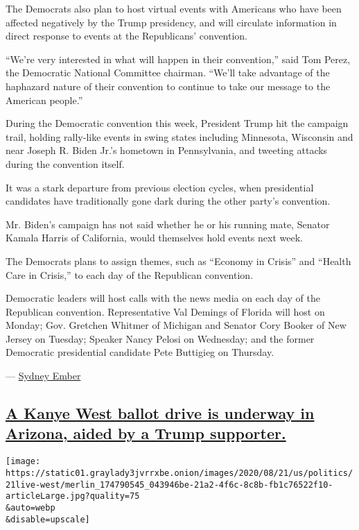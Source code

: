 The Democrats also plan to host virtual events with Americans who have
been affected negatively by the Trump presidency, and will circulate
information in direct response to events at the Republicans' convention.

``We're very interested in what will happen in their convention,'' said
Tom Perez, the Democratic National Committee chairman. ``We'll take
advantage of the haphazard nature of their convention to continue to
take our message to the American people.''

During the Democratic convention this week, President Trump hit the
campaign trail, holding rally-like events in swing states including
Minnesota, Wisconsin and near Joseph R. Biden Jr.'s hometown in
Pennsylvania, and tweeting attacks during the convention itself.

It was a stark departure from previous election cycles, when
presidential candidates have traditionally gone dark during the other
party's convention.

Mr. Biden's campaign has not said whether he or his running mate,
Senator Kamala Harris of California, would themselves hold events next
week.

The Democrats plans to assign themes, such as ``Economy in Crisis'' and
``Health Care in Crisis,'' to each day of the Republican convention.

Democratic leaders will host calls with the news media on each day of
the Republican convention. Representative Val Demings of Florida will
host on Monday; Gov. Gretchen Whitmer of Michigan and Senator Cory
Booker of New Jersey on Tuesday; Speaker Nancy Pelosi on Wednesday; and
the former Democratic presidential candidate Pete Buttigieg on Thursday.

--- \href{https://www.nytimes3xbfgragh.onion/by/sydney-ember}{Sydney
Ember}

\hypertarget{a-kanye-west-ballot-drive-is-underway-in-arizona-aided-by-a-trump-supporter}{%
\subsection{\texorpdfstring{\protect\hyperlink{a-kanye-west-ballot-drive-is-underway-in-arizona-aided-by-a-trump-supporter}{A
Kanye West ballot drive is underway in Arizona, aided by a Trump
supporter.}}{A Kanye West ballot drive is underway in Arizona, aided by a Trump supporter.}}\label{a-kanye-west-ballot-drive-is-underway-in-arizona-aided-by-a-trump-supporter}}

\texttt{[image: https://static01.graylady3jvrrxbe.onion/images/2020/08/21/us/politics/21live-west/merlin\_174790545\_043946be-21a2-4f6c-8c8b-fb1c76522f10-articleLarge.jpg?quality=75\\\&auto=webp\\\&disable=upscale]}

